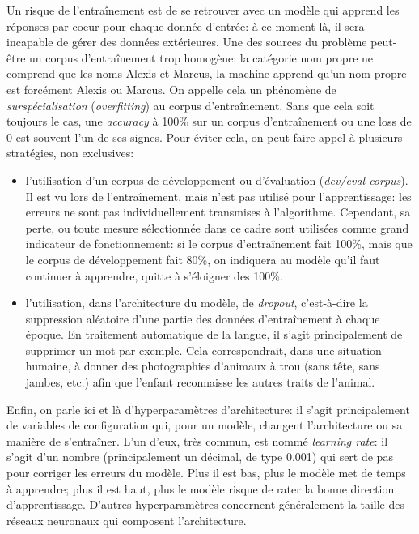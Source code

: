 \label{deep-learning:overfitting}
Un risque de l'entraînement est de se retrouver avec un modèle qui apprend les réponses par coeur pour chaque donnée d'entrée: à ce moment là, il sera incapable de gérer des données extérieures. Une des sources du problème peut-être un corpus d'entraînement trop homogène: la catégorie nom propre ne comprend que les noms Alexis et Marcus, la machine apprend qu'un nom propre est forcément Alexis ou Marcus. On appelle cela un phénomène de \textit{surspécialisation} (\textit{overfitting}) au corpus d'entraînement. Sans que cela soit toujours le cas, une \textit{accuracy} à 100\% sur un corpus d'entraînement ou une loss de 0 est souvent l'un de ses signes. Pour éviter cela, on peut faire appel à plusieurs stratégies, non exclusives:
\begin{itemize}
    \item l'utilisation d'un corpus de développement ou d'évaluation (\textit{dev/eval corpus}). Il est vu lors de l'entraînement, mais n'est pas utilisé pour l'apprentissage: les erreurs ne sont pas individuellement transmises à l'algorithme. Cependant, sa perte, ou toute mesure sélectionnée dans ce cadre sont utilisées comme grand indicateur de fonctionnement: si le corpus d'entraînement fait 100\%, mais que le corpus de développement fait 80\%, on indiquera au modèle qu'il faut continuer à apprendre, quitte à s'éloigner des 100\%.
    \item l'utilisation, dans l'architecture du modèle, de \textit{dropout}, c'est-à-dire la suppression aléatoire d'une partie des données d'entraînement à chaque époque. En traitement automatique de la langue, il s'agit principalement de supprimer un mot par exemple. Cela correspondrait, dans une situation humaine, à donner des photographies d'animaux à trou (sans tête, sans jambes, etc.) afin que l'enfant reconnaisse les autres traits de l'animal. %
\end{itemize}

Enfin, on parle ici et là d'hyperparamètres d'architecture: il s'agit principalement de variables de configuration qui, pour un modèle, changent l'architecture ou sa manière de s'entraîner. L'un d'eux, très commun, est nommé \textit{learning rate}: il s'agit d'un nombre (principalement un décimal, de type 0.001) qui sert de pas pour corriger les erreurs du modèle. Plus il est bas, plus le modèle met de temps à apprendre; plus il est haut, plus le modèle risque de rater la bonne direction d'apprentissage. D'autres hyperparamètres concernent généralement la taille des réseaux neuronaux qui composent l'architecture. 

